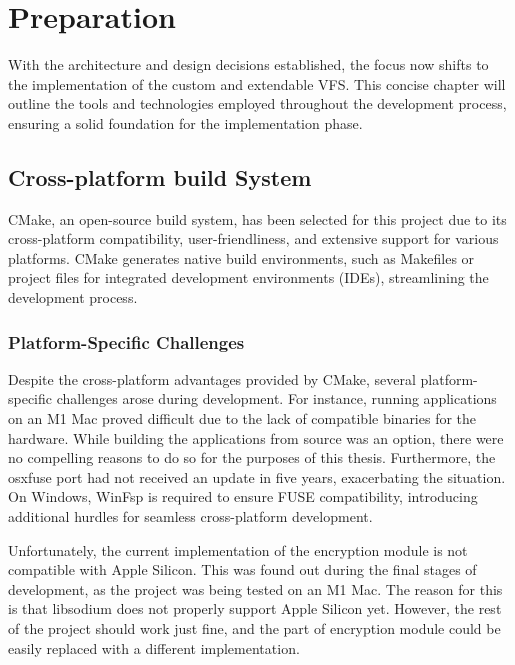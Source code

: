 \chapter{Preparation}
\label{chap:preparation}

With the architecture and design decisions established, the focus now shifts to the implementation of the custom and extendable VFS\@.
This concise chapter will outline the tools and technologies employed throughout the development process, ensuring a solid foundation for the implementation phase.


\section{Cross-platform build System}\label{sec:build-system-and-cross-platform-challenges}

CMake\cite{cmake}, an open-source build system, has been selected for this project due to its cross-platform compatibility, user-friendliness, and extensive support for various platforms.
CMake generates native build environments, such as Makefiles or project files for integrated development environments (IDEs), streamlining the development process.

\subsection{Platform-Specific Challenges}\label{subsec:platform-specific-challenges}

Despite the cross-platform advantages provided by CMake, several platform-specific challenges arose during development.
For instance, running applications on an M1 Mac proved difficult due to the lack of compatible binaries for the hardware.
While building the applications from source was an option, there were no compelling reasons to do so for the purposes of this thesis.
Furthermore, the osxfuse port had not received an update in five years, exacerbating the situation.
On Windows, WinFsp\cite{winfsp} is required to ensure FUSE compatibility, introducing additional hurdles for seamless cross-platform development.

Unfortunately, the current implementation of the encryption module is not compatible with Apple Silicon.
This was found out during the final stages of development, as the project was being tested on an M1 Mac.
The reason for this is that libsodium does not properly support Apple Silicon yet.
However, the rest of the project should work just fine, and the part of encryption module could be easily replaced with a different implementation.


